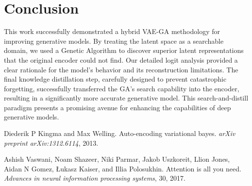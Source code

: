 \documentclass[11pt, a4paper, twocolumn]{article}
\begin{document}
\section{Conclusion}
This work successfully demonstrated a hybrid VAE-GA methodology for improving generative models. By treating the latent space as a searchable domain, we used a Genetic Algorithm to discover superior latent representations that the original encoder could not find. Our detailed logit analysis provided a clear rationale for the model's behavior and its reconstruction limitations. The final knowledge distillation step, carefully designed to prevent catastrophic forgetting, successfully transferred the GA's search capability into the encoder, resulting in a significantly more accurate generative model. This search-and-distill paradigm presents a promising avenue for enhancing the capabilities of deep generative models.

\begin{thebibliography}{9}
    Diederik P Kingma and Max Welling.
    \newblock Auto-encoding variational bayes.
    \newblock \emph{arXiv preprint arXiv:1312.6114}, 2013.

    Ashish Vaswani, Noam Shazeer, Niki Parmar, Jakob Uszkoreit, Llion Jones, Aidan N Gomez, \L{}ukasz Kaiser, and Illia Polosukhin.
    \newblock Attention is all you need.
    \newblock \emph{Advances in neural information processing systems}, 30, 2017.
\end{thebibliography}
\end{document}

